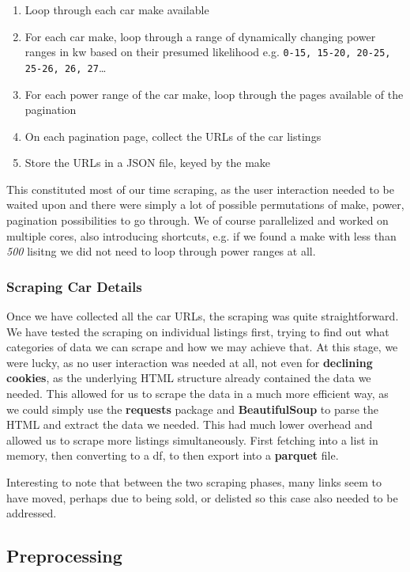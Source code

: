 \documentclass[12pt]{article}
\begin{document}
\begin{enumerate}
  \item Loop through each car make available
  \item For each car make, loop through a range of dynamically changing power ranges in kw based on their presumed likelihood e.g. \texttt{0-15, 15-20, 20-25, 25-26, 26, 27}\dots
  \item For each power range of the car make, loop through the pages available of the pagination
  \item On each pagination page, collect the URLs of the car listings
  \item Store the URLs in a JSON file, keyed by the make
\end{enumerate}

This constituted most of our time scraping, as the user interaction needed to be waited upon and there were simply a lot of possible permutations of make, power, pagination possibilities to go through.
We of course parallelized and worked on multiple cores, also introducing shortcuts, e.g. if we found a make with less than \textit{500} lisitng we did not need to loop through power ranges at all.

\subsubsection{Scraping Car Details}

Once we have collected all the car URLs, the scraping was quite straightforward. We have tested the scraping on individual listings first, trying to find out what categories of data we can scrape and how we may achieve that. At this stage, we were lucky, as no user interaction was needed at all, not even for \textbf{declining cookies}, as the underlying HTML structure already contained the data we needed.
This allowed for us to scrape the data in a much more efficient way, as we could simply use the \textbf{requests} package and \textbf{BeautifulSoup} to parse the HTML and extract the data we needed. This had much lower overhead and allowed us to scrape more listings simultaneously. First fetching into a list in memory, then converting to a df, to then export into a \textbf{parquet} file.

Interesting to note that between the two scraping phases, many links seem to have moved, perhaps due to being sold, or delisted so this case also needed to be addressed.

\subsection{Preprocessing}
\end{document}
